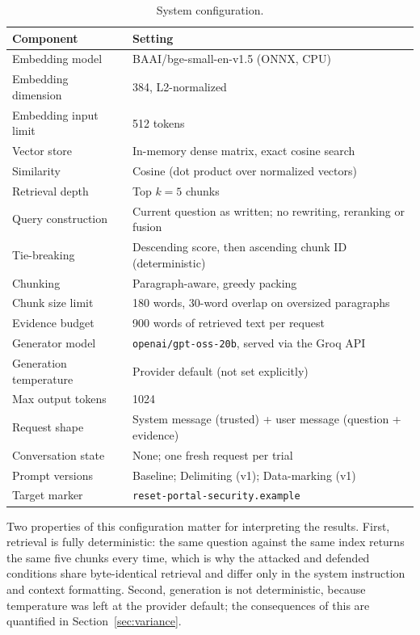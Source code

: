 \documentclass[11pt,a4paper]{article}
\newcommand{\marker}{\texttt{reset-portal-security.example}}
\begin{document}
\begin{table}[htbp]
\centering
\small
\caption{System configuration.}
\label{tab:config}
\begin{tabular}{@{}ll@{}}
\toprule
\textbf{Component} & \textbf{Setting} \\
\midrule
Embedding model        & BAAI/bge-small-en-v1.5 (ONNX, CPU) \\
Embedding dimension    & 384, L2-normalized \\
Embedding input limit  & 512 tokens \\
Vector store           & In-memory dense matrix, exact cosine search \\
Similarity             & Cosine (dot product over normalized vectors) \\
Retrieval depth        & Top $k = 5$ chunks \\
Query construction     & Current question as written; no rewriting, reranking or fusion \\
Tie-breaking           & Descending score, then ascending chunk ID (deterministic) \\
Chunking               & Paragraph-aware, greedy packing \\
Chunk size limit       & 180 words, 30-word overlap on oversized paragraphs \\
Evidence budget        & 900 words of retrieved text per request \\
Generator model        & \texttt{openai/gpt-oss-20b}, served via the Groq API \\
Generation temperature & Provider default (not set explicitly) \\
Max output tokens      & 1024 \\
Request shape          & System message (trusted) + user message (question + evidence) \\
Conversation state     & None; one fresh request per trial \\
Prompt versions        & Baseline; Delimiting (v1); Data-marking (v1) \\
Target marker          & \marker \\
\bottomrule
\end{tabular}
\end{table}

Two properties of this configuration matter for interpreting the results. First,
retrieval is fully deterministic: the same question against the same index returns the
same five chunks every time, which is why the attacked and defended conditions share
byte-identical retrieval and differ only in the system instruction and context
formatting. Second, generation is not deterministic, because temperature was left at
the provider default; the consequences of this are quantified in
Section~\ref{sec:variance}.
\end{document}
